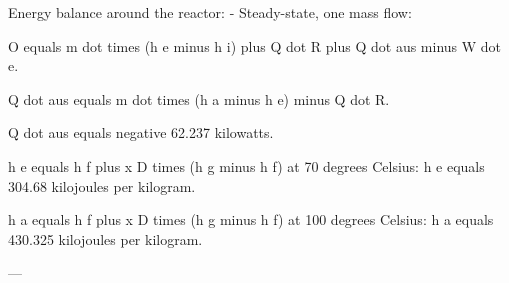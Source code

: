 Energy balance around the reactor:  
- Steady-state, one mass flow:  

O equals m dot times (h e minus h i) plus Q dot R plus Q dot aus minus W dot e.  

Q dot aus equals m dot times (h a minus h e) minus Q dot R.  

Q dot aus equals negative 62.237 kilowatts.  

h e equals h f plus x D times (h g minus h f) at 70 degrees Celsius:  
h e equals 304.68 kilojoules per kilogram.  

h a equals h f plus x D times (h g minus h f) at 100 degrees Celsius:  
h a equals 430.325 kilojoules per kilogram.  

---